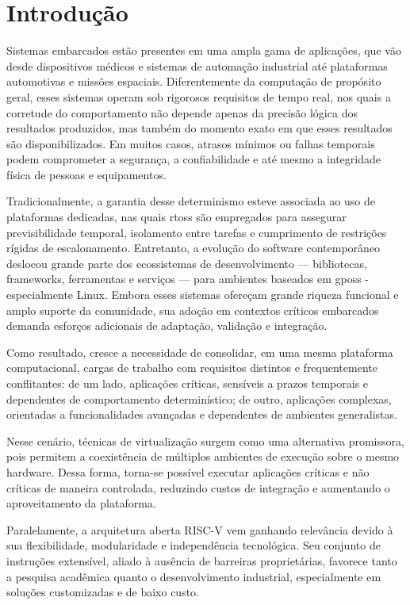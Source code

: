 \chapter{Introdução}

Sistemas embarcados estão presentes em uma ampla gama de aplicações, que vão desde dispositivos médicos e sistemas de automação industrial
até plataformas automotivas e missões espaciais. Diferentemente da computação de propósito geral, esses sistemas operam sob rigorosos requisitos
de tempo real, nos quais a corretude do comportamento não depende apenas da precisão lógica dos resultados produzidos, mas também do momento
exato em que esses resultados são disponibilizados. Em muitos casos, atrasos mínimos ou falhas temporais podem comprometer a segurança, a
confiabilidade e até mesmo a integridade física de pessoas e equipamentos.

Tradicionalmente, a garantia desse determinismo esteve associada ao uso de plataformas dedicadas, nas quais \glspl{rtos} são empregados para assegurar
previsibilidade temporal, isolamento entre tarefas e cumprimento de restrições rígidas de escalonamento. Entretanto, a evolução do software contemporâneo
deslocou grande parte dos ecossistemas de desenvolvimento — bibliotecas, frameworks, ferramentas e serviços — para ambientes baseados em \glspl{gpos} - 
especialmente Linux. Embora esses sistemas ofereçam grande riqueza funcional e amplo suporte da comunidade, sua adoção em contextos críticos embarcados demanda
esforços adicionais de adaptação, validação e integração.

Como resultado, cresce a necessidade de consolidar, em uma mesma plataforma computacional, cargas de trabalho com requisitos distintos e frequentemente
conflitantes: de um lado, aplicações críticas, sensíveis a prazos temporais e dependentes de comportamento determinístico; de outro, aplicações complexas,
orientadas a funcionalidades avançadas e dependentes de ambientes generalistas.

Nesse cenário, técnicas de virtualização surgem como uma alternativa promissora, pois permitem a coexistência de múltiplos ambientes de execução sobre o
mesmo hardware. Dessa forma, torna-se possível executar aplicações críticas e não críticas de maneira controlada, reduzindo custos de integração e
aumentando o aproveitamento da plataforma.

Paralelamente, a arquitetura aberta RISC-V vem ganhando relevância  devido à sua flexibilidade, modularidade e independência
tecnológica. Seu conjunto de instruções extensível, aliado à ausência de barreiras proprietárias, favorece tanto a pesquisa acadêmica quanto o desenvolvimento
industrial, especialmente em soluções customizadas e de baixo custo.

